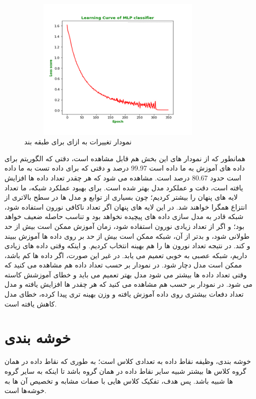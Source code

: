 \documentclass[12pt,onecolumn,a4paper]{article}
\begin{document}
\begin{figure}
  \centering
  \includegraphics[width=10cm,height=7cm,keepaspectratio]{17.png}
  \caption{نمودار تغییرات  به ازای  برای طبقه بند }
  \label{fig:LossMLP}
\end{figure}

همانطور که از نمودار های این بخش هم قابل مشاهده است، دقتی که الگوریتم  برای داده های آموزش به ما داده است 99.97 درصد و دقتی که برای داده تست به ما داده است حدود 80.67 درصد است. مشاهده می شود که هر چقدر تعداد داده ها افزایش یافته است، دقت و عملکرد مدل بهتر شده است. برای بهبود عملکرد شبکه، ما تعداد لایه های پنهان را بیشتر کردیم؛ چون بسیاری از توابع و مدل ها در سطح بالاتری از انتزاع همگرا خواهند شد. در این لایه های پنهان اگر تعداد ناکافی نورون استفاده شود، شبکه قادر به مدل سازی داده های پیچیده نخواهد بود و تناسب حاصله ضعیف خواهد بود؛ و اگر از تعداد زیادی نورون استفاده شود، زمان آموزش ممکن است بیش از حد طولانی شود، و بدتر از آن، شبکه ممکن است بیش از حد بر روی داده ها آموزش ببیند و  کند. در نتیجه تعداد نورون ها را هم بهینه انتخاب کردیم. و اینکه وقتی داده های زیادی داریم، شبکه عصبی به خوبی تعمیم می یابد. در غیر این صورت، اگر داده ها کم باشد، ممکن است مدل دچار  شود. در نمودار  بر حسب تعداد داده هم مشاهده می کنید که وقتی تعداد داده ها بیشتر می شود مدل بهتر تعمیم می باید و خطای آموزشش کاسته می شود. در نمودار  بر حسب  هم مشاهده می کنید که هر چقدر  ها افزایش یافته و مدل تعداد دفعات بیشتری روی داده آموزش یافته و وزن بهینه تری پیدا کرده، خطای مدل کاهش یافته است.

\section{خوشه بندی}
خوشه بندی، وظیفه نقاط داده به تعدادی کلاس است؛ به طوری که نقاط داده در همان گروه کلاس ها بیشتر شبیه سایر نقاط داده در همان گروه باشد تا اینکه به سایر گروه ها شبیه باشد. پس هدف، تفکیک کلاس هایی با صفات مشابه و تخصیص آن ها به خوشه‌ها است.
\end{document}
